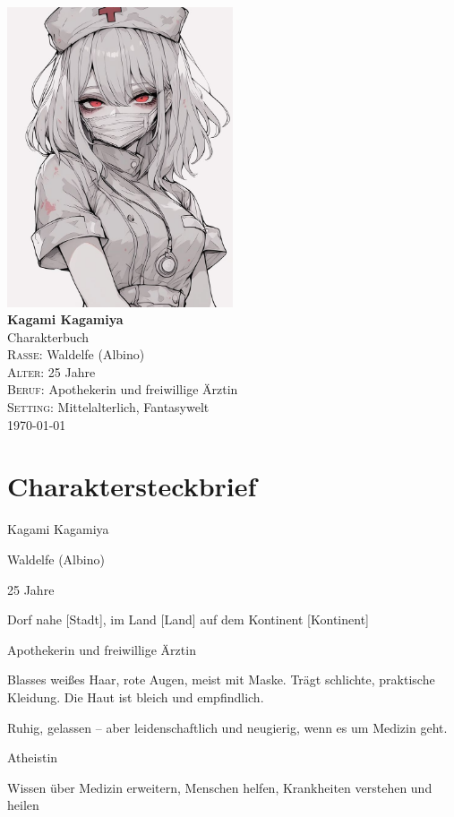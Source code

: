 \documentclass[12pt,a4paper]{article}
\begin{document}
\begin{titlepage}
    \centering
    \vspace*{2cm}
    \includegraphics[width=0.5\textwidth]{kagami.jpg}\\[1.5cm]
    {\Huge\bfseries Kagami Kagamiya}\\[0.5cm]
    {\Large Charakterbuch}\\[2cm]
    \vfill
    \textsc{Rasse:} Waldelfe (Albino) \\
    \textsc{Alter:} 25 Jahre \\
    \textsc{Beruf:} Apothekerin und freiwillige Ärztin \\
    \textsc{Setting:} Mittelalterlich, Fantasywelt \\
    \vfill
    \today
\end{titlepage}

\newpage
\tableofcontents
\newpage

\section*{Charaktersteckbrief}
\begin{description}[style=nextline]
  \item[Name:] Kagami Kagamiya
  \item[Rasse:] Waldelfe (Albino)
  \item[Alter:] 25 Jahre
  \item[Herkunft:] Dorf nahe [Stadt], im Land [Land] auf dem Kontinent [Kontinent]
  \item[Beruf:] Apothekerin und freiwillige Ärztin
  \item[Aussehen:] Blasses weißes Haar, rote Augen, meist mit Maske. Trägt schlichte, praktische Kleidung. Die Haut ist bleich und empfindlich.
  \item[Charakter:] Ruhig, gelassen – aber leidenschaftlich und neugierig, wenn es um Medizin geht.
  \item[Glaube:] Atheistin
  \item[Ziele:] Wissen über Medizin erweitern, Menschen helfen, Krankheiten verstehen und heilen
\end{description}
\end{document}
